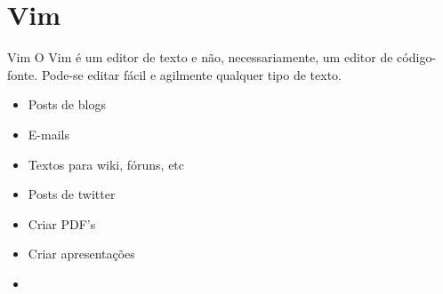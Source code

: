 \section{Vim}
\begin{frame}{Vim}
O Vim é um editor de texto e não, necessariamente, um editor de código-fonte.
Pode-se editar fácil e agilmente qualquer tipo de texto.
\begin{itemize}
	\item Posts de blogs
	\item E-mails
	\item Textos para wiki, fóruns, etc
	\item Posts de twitter
	\item Criar PDF's
	\item Criar apresentações
	\item <Insira sua idéia aqui>
\end{itemize}
\end{frame}
